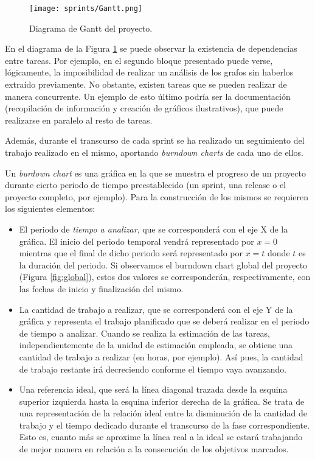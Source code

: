 \begin{figure}[H]
    \centering
    \texttt{[image: sprints/Gantt.png]}
    \caption{Diagrama de Gantt del proyecto.}
    \label{fig:gantt}
\end{figure}

En el diagrama de la Figura \ref{fig:gantt} se puede observar la existencia de dependencias entre tareas. Por ejemplo, en el segundo bloque presentado puede verse, lógicamente, la imposibilidad de realizar un análisis de los grafos sin haberlos extraído previamente. No obstante, existen tareas que se pueden realizar de manera concurrente. Un ejemplo de esto último podría ser la documentación (recopilación de información y creación de gráficos ilustrativos), que puede realizarse en paralelo al resto de tareas.

Además, durante el transcurso de cada sprint se ha realizado un seguimiento del trabajo realizado en el mismo, aportando \emph{burndown charts} de cada uno de ellos.

Un \emph{burdown chart} es una gráfica en la que se muestra el progreso de un proyecto durante cierto periodo de tiempo preestablecido (un sprint, una release o el proyecto completo, por ejemplo). Para la construcción de los mismos se requieren los siguientes elementos:
\begin{itemize}
\item El periodo de \emph{tiempo a analizar}, que se corresponderá con el eje X de la gráfica. El inicio del periodo temporal vendrá representado por $x = 0$ mientras que el final de dicho periodo será representado por $x = t$ donde $t$ es la duración del periodo. Si observamos el burndown chart global del proyecto (Figura \ref{fig:global}), estos dos valores se corresponderán, respectivamente, con las fechas de inicio y finalización del mismo.
\item La cantidad de trabajo a realizar, que se corresponderá con el eje Y de la gráfica y representa el trabajo planificado que se deberá realizar en el periodo de tiempo a analizar. Cuando se realiza la estimación de las tareas, independientemente de la unidad de estimación empleada, se obtiene una cantidad de trabajo a realizar (en horas, por ejemplo). Así pues, la cantidad de trabajo restante irá decreciendo conforme el tiempo vaya avanzando.
\item Una referencia ideal, que será la línea diagonal trazada desde la esquina superior izquierda hasta la esquina inferior derecha de la gráfica. Se trata de una representación de la relación ideal entre la disminución de la cantidad de trabajo y el tiempo dedicado durante el transcurso de la fase correspondiente. Esto es, cuanto más se aproxime la línea real a la ideal se estará trabajando de mejor manera en relación a la consecución de los objetivos marcados.
\end{itemize}

